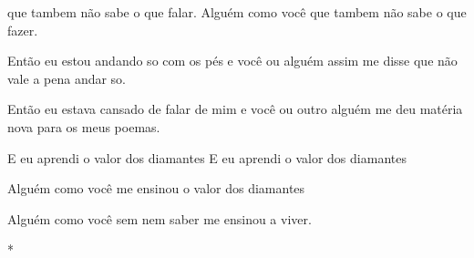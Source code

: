 \begin{poem}
\begin{stanza}
que tambem não sabe o que falar.\verseline
Alguém como você\verseline
que tambem não sabe o que fazer.
\end{stanza}
\begin{stanza}
Então eu estou andando so com os pés\verseline
e você ou alguém assim me disse\verseline
que não vale a pena andar so.
\end{stanza}
\begin{stanza}
Então eu estava cansado de falar de mim\verseline
e você ou outro alguém me deu\verseline
matéria nova para os meus poemas.
\end{stanza}
\begin{stanza}
E eu aprendi o valor dos diamantes\verseline
E eu aprendi o valor dos diamantes
\end{stanza}
\begin{stanza}
Alguém como você me ensinou\verseline
o valor dos diamantes
\end{stanza}
\begin{stanza}
Alguém como você\verseline
sem nem saber\verseline
me ensinou a viver.
\end{stanza}
\begin{stanza}
*
\end{stanza}
\end{poem}